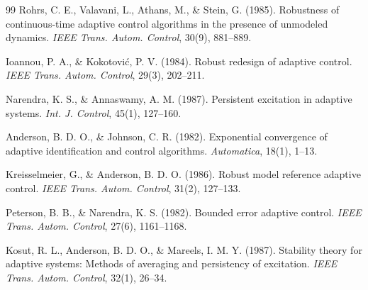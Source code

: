\documentclass[a4paper, 11pt]{article}
\begin{document}
\begin{thebibliography}{99}
Rohrs, C. E., Valavani, L., Athans, M., \& Stein, G. (1985). Robustness of continuous-time adaptive control algorithms in the presence of unmodeled dynamics. \textit{IEEE Trans. Autom. Control}, 30(9), 881--889.

Ioannou, P. A., \& Kokotovi{\'c}, P. V. (1984). Robust redesign of adaptive control. \textit{IEEE Trans. Autom. Control}, 29(3), 202--211.

Narendra, K. S., \& Annaswamy, A. M. (1987). Persistent excitation in adaptive systems. \textit{Int. J. Control}, 45(1), 127--160.

Anderson, B. D. O., \& Johnson, C. R. (1982). Exponential convergence of adaptive identification and control algorithms. \textit{Automatica}, 18(1), 1--13.

Kreisselmeier, G., \& Anderson, B. D. O. (1986). Robust model reference adaptive control. \textit{IEEE Trans. Autom. Control}, 31(2), 127--133.

Peterson, B. B., \& Narendra, K. S. (1982). Bounded error adaptive control. \textit{IEEE Trans. Autom. Control}, 27(6), 1161--1168.

Kosut, R. L., Anderson, B. D. O., \& Mareels, I. M. Y. (1987). Stability theory for adaptive systems: Methods of averaging and persistency of excitation. \textit{IEEE Trans. Autom. Control}, 32(1), 26--34.

\end{thebibliography}
\end{document}
